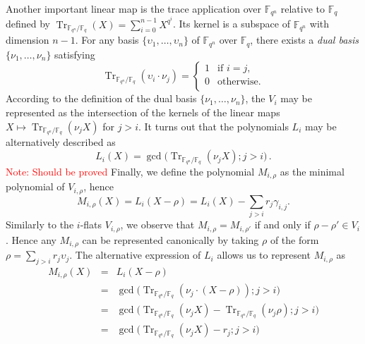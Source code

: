 \documentclass{article}
\newcommand{\ff}[1]{\mathbb{F}_{#1}}
\newcommand{\qq}{q}
\newcommand{\nn}{n}
\newcommand{\qn}{{\qq^\nn}}
\newcommand{\basef}{\ff{\qq}}
\newcommand{\extf}{\ff{\qn}}
\DeclareMathOperator{\Tr}{Tr}
\DeclareMathOperator{\Ker}{Ker}
\newcommand{\Notes}[1]{\textcolor{red}{Note: #1}}
\begin{document}
\medskip

Another important linear map is the trace application over $\extf$ relative to $\basef$ defined by $\Tr_{\extf/\basef}(X)=\sum_{i=0}^{n-1} X^{\qq^i}$. Its kernel is a subspace of $\extf$ with dimension $n-1$. For any basis $\{\upsilon_1,\ldots,\upsilon_\nn\}$ of $\extf$ over $\basef$, there exists a \emph{dual basis} $\{\nu_1,\ldots,\nu_\nn\}$ satisfying
$$
\Tr_{\extf/\basef}(\upsilon_i \cdot \nu_j)=
\left\{
\begin{array}{ll}
1 & \mbox{if } i=j, \\
0 &  \mbox{otherwise}. \\
\end{array}
\right.
$$
According to the definition of the dual  basis $\{\nu_1,\ldots,\nu_\nn\}$, the $V_i$ may be represented as 
the intersection of the kernels of the linear maps $X \mapsto \Tr_{\extf/\basef}(\nu_j X )$ for $j>i$. It turns out that the polynomials 
 $L_i$ may be alternatively described as
 \begin{equation}
 \label{L_i_alt_formula}
 L_i(X)=\gcd\bigl(\Tr_{\extf/\basef}(\nu_j X );j>i\bigr) \,.
 \end{equation}
 \Notes{Should be proved}
Finally, we define the polynomial $M_{i,\rho}$ as the minimal
polynomial of $V_{i,\rho}$, hence
\begin{equation}
  M_{i,\rho}(X) = L_i(X - \rho) = L_i(X) - \sum_{j>i}r_j\gamma_{i,j}.
\end{equation}
Similarly to the $i$-flats $V_{i,\rho}$, we observe that $M_{i,\rho}=M_{i,\rho'}$ if and only if $\rho-\rho'\in V_i$. Hence
any $M_{i,\rho}$ can be represented canonically by taking $\rho$ of
the form $\rho=\sum_{j>i}r_j\upsilon_j$. The alternative expression of $L_i$ allows us to represent $M_{i,\rho}$ as
\begin{equation}
\label{alternative_M_i_rho}
\begin{array}{lll}
M_{i,\rho}(X)&=& L_i(X-\rho) \\
&=&\gcd\bigl(\Tr_{\extf/\basef}(\nu_j \cdot  (X-\rho) );j>i\bigr)  \\
&=& \gcd\bigl(\Tr_{\extf/\basef}(\nu_j X) -\Tr_{\extf/\basef}(\nu_j \rho) ;j>i\bigr)  \\
&=&  \gcd\bigl(\Tr_{\extf/\basef}(\nu_j X) -r_j ;j>i\bigr)  \\
\end{array}
\end{equation}
\end{document}
